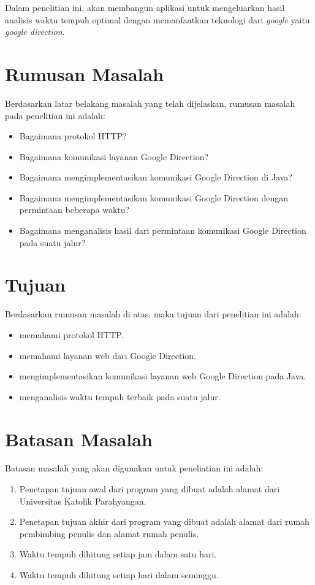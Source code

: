 Dalam penelitian ini, akan membangun aplikasi untuk mengeluarkan hasil analisis waktu tempuh optimal dengan memanfaatkan teknologi dari \textit{google} yaitu \textit{google direction}.

\section{Rumusan Masalah}
\label{sec:rumusan}
Berdasarkan latar belakang masalah yang telah dijelaskan, rumusan masalah pada penelitian ini adalah:
\begin{itemize}
	\item Bagaimana protokol HTTP?
	\item Bagaimana komunikasi layanan Google Direction?
	\item Bagaimana mengimplementasikan komunikasi Google Direction di Java?
	\item Bagaimana mengimplementasikan komunikasi Google Direction dengan permintaan beberapa waktu?
	\item Bagaimana menganalisis hasil dari permintaan komunikasi Google Direction pada suatu jalur?
\end{itemize}

\section{Tujuan}
\label{sec:tujuan}
Berdasarkan rumusan masalah di atas, maka tujuan dari penelitian ini adalah:
\begin{itemize}
	\item memahami protokol HTTP.
	\item memahami layanan web dari Google Direction.
	\item mengimplementasikan komunikasi layanan web Google Direction pada Java.
	\item menganalisis waktu tempuh terbaik pada suatu jalur.
\end{itemize}

\section{Batasan Masalah}
\label{sec:batasan}
Batasan masalah yang akan digunakan untuk peneliatian ini adalah:
\begin{enumerate}
	\item Penetapan tujuan awal dari program yang dibuat adalah alamat dari Universitas Katolik Parahyangan.
	\item Penetapan tujuan akhir dari program yang dibuat adalah alamat dari rumah pembimbing penulis dan alamat rumah penulis.
	\item Waktu tempuh dihitung setiap jam dalam satu hari.
	\item Waktu tempuh dihitung setiap hari dalam seminggu.
\end{enumerate}


